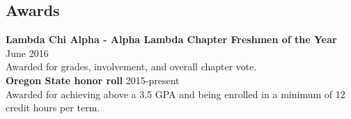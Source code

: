 \documentclass[margin,line, 11pt]{res}
\begin{document}
\begin{resume}
\section{\sc Awards}
	{\bf Lambda Chi Alpha - Alpha Lambda Chapter Freshmen of the Year} \hfill June 2016 \\
	Awarded for grades, involvement, and overall chapter vote.	\\
	{\bf Oregon State honor roll} \hfill 2015-present \\
	Awarded for achieving above a 3.5 GPA and being enrolled in a minimum of 12 credit hours per term. 
\end{resume}
\end{document}
